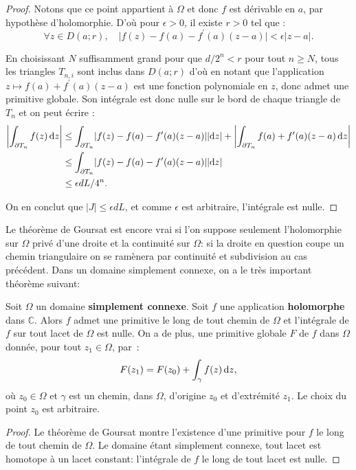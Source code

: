 \begin{proof}
Notons que ce point appartient à $\Omega$ et donc $f$ est dérivable en $a$, par hypothèse d'holomorphie. D'où pour $\epsilon > 0$, il existe $r >0$ tel que :
\[
\forall z \in D(a;r), \quad \lvert f(z)-f(a)-f^\prime(a)(z-a)\rvert  < \epsilon \lvert z-a\rvert
.\]

En choisissant $N$ suffisamment grand pour que $d/2^n <r$ pour tout $n \geq N$, tous les triangles $T_{n,i}$ sont inclus dans $D(a;r)$ d'où en notant que l'application  $z \mapsto f(a)+f^\prime(a)(z-a)$ est une fonction polynomiale en $z$,
donc admet une primitive globale. Son intégrale est donc nulle sur le
bord de chaque triangle de $T_n$ et on peut écrire :
\begin{align*}
 \left \lvert
\int_{\partial T_n} f(z) \mathop{}\mathopen{}\mathrm{d} z
\right \rvert & \leq  \int_{\partial T_n}  \lvert f(z)-f(a)-f^\prime(a)(z-a)\rvert \lvert \mathop{}\mathopen{}\mathrm{d} z \rvert+ \left \lvert \int_{\partial T_n} f(a)+f^\prime(a)(z-a) \mathop{}\mathopen{}\mathrm{d} z \right\rvert   \\
& \leq \int_{\partial T_n}  \lvert f(z)-f(a)-f^\prime(a)(z-a)\rvert \lvert \mathop{}\mathopen{}\mathrm{d} z\rvert\\
& \leq  \epsilon d L/4^n.
\end{align*}

On en conclut que $\lvert J \rvert \leq \epsilon  d L$, et comme  
$\epsilon$ est arbitraire, l'intégrale est nulle.
\end{proof}

Le théorème de Goursat est encore vrai si l'on suppose seulement l'holomorphie
sur $\Omega$ privé d'une droite et la continuité sur $\Omega$: si la droite en
question coupe un chemin triangulaire on se ramènera par continuité et
subdivision au cas précédent. Dans un domaine simplement connexe, on a le très important théorème suivant:

\begin{fthm}
Soit $\Omega$ un domaine \textbf{simplement connexe}. Soit $f$ une application \textbf{holomorphe}
dans $\mathbb{C}$. Alors $f$ admet une primitive le long de tout chemin de
$\Omega$ et l'intégrale de $f$ sur tout lacet de $\Omega$ est nulle. On a de plus, une primitive globale $F$ de $f$ dans $\Omega$ donnée, pour tout $z_1 \in \Omega$, par~:
\[F(z_1)= F(z_0) + \int_\gamma f(z) \mathop{}\mathopen{}\mathrm{d} z,\]
où $z_0 \in \Omega$ et $\gamma$ est un chemin,  dans $\Omega$, d'origine $z_0$ et d'extrémité $z_1$. Le choix du point $z_0$ est arbitraire.


\end{fthm}

\begin{proof}
Le théorème de Goursat montre l'existence d'une primitive pour $f$ le long de
tout chemin de $\Omega$. Le domaine étant simplement connexe, tout lacet est
homotope à un lacet constant: l'intégrale de $f$ le long de tout lacet est
nulle.
\end{proof}

